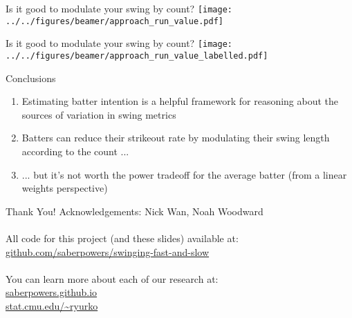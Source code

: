 \documentclass{beamer}
\begin{document}
\begin{frame}{Is it good to modulate your swing by count?}
  \centering
  \texttt{[image: ../../figures/beamer/approach\_run\_value.pdf]}
\end{frame}

\begin{frame}{Is it good to modulate your swing by count?}
  \centering
  \texttt{[image: ../../figures/beamer/approach\_run\_value\_labelled.pdf]}
\end{frame}

\begin{frame}{Conclusions}
  \begin{enumerate}
    \item Estimating batter \alert{intention} is a helpful framework for reasoning about the sources of variation in swing metrics
    \item Batters can reduce their strikeout rate by modulating their swing length according to the count ...
    \item ... but it's not worth the power tradeoff for the average batter (from a linear weights perspective)
  \end{enumerate}
\end{frame}

\begin{frame}{Thank You!}
  Acknowledgements: Nick Wan, Noah Woodward\\
  ~\\
  All code for this project (and these slides) available at:\\
  \alert{\url{github.com/saberpowers/swinging-fast-and-slow}}\\
  ~\\
  You can learn more about each of our research at:\\
  \alert{
    \url{saberpowers.github.io}\\
    \url{stat.cmu.edu/~ryurko}
  }
\end{frame}
\end{document}
